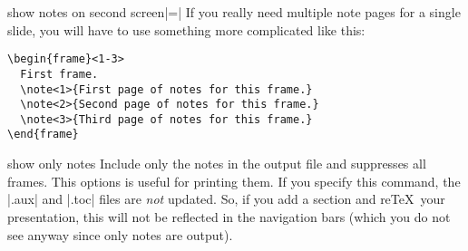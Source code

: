 \begin{beameroption}{show notes on second screen}{|=|}
  If you really need multiple note pages for a single slide, you will have to use something more complicated like this:
\begin{verbatim}
\begin{frame}<1-3>
  First frame.
  \note<1>{First page of notes for this frame.}
  \note<2>{Second page of notes for this frame.}
  \note<3>{Third page of notes for this frame.}
\end{frame}
\end{verbatim}
\end{beameroption}


\begin{beameroption}{show only notes}{}
  Include only the notes in the output file and suppresses all frames. This options is useful for printing them. If you specify this command, the |.aux| and |.toc| files are \emph{not} updated. So, if you add a section and re\TeX\ your presentation, this will not be reflected in the navigation bars (which you do not see anyway since only notes are output).
\end{beameroption}
